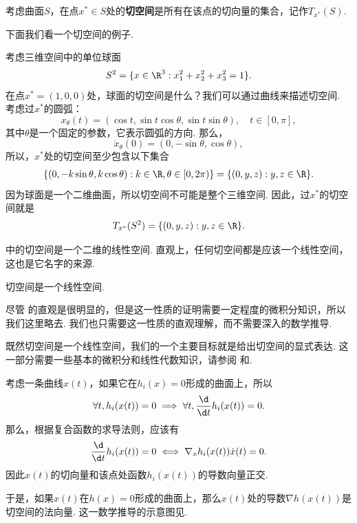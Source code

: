 \begin{definition}[切空间]
    考虑曲面$S$，在点$x^*\in S$处的\textbf{切空间}是所有在该点的切向量的集合，记作$T_{x^*}(S)$.
\end{definition}

下面我们看一个切空间的例子.

\begin{example}[三维球面的切空间]\label{ex:tan-space}
    考虑三维空间中的单位球面
    \[S^2=\{x\in\R^3:x_1^2+x_2^2+x_3^2=1\}.\]
    在点$x^*=(1,0,0)$处，球面的切空间是什么？我们可以通过曲线来描述切空间. 考虑过$x^*$的圆弧：
    \[x_\theta(t)=(\cos t,\sin t\cos\theta,\sin t\sin\theta), \quad t\in[0,\pi],\]
    其中$\theta$是一个固定的参数，它表示圆弧的方向. 那么，
    \[\dot{x}_\theta(0)=(0,-\sin\theta,\cos\theta),\]
    所以，$x^*$处的切空间至少包含以下集合
    \begin{align*}
        \{(0,-k\sin \theta,k\cos\theta):k\in\R,\theta\in[0,2\pi)\}= \{(0,y,z):y,z\in\R\}.
    \end{align*}
    因为球面是一个二维曲面，所以切空间不可能是整个三维空间. 因此，过$x^*$的切空间就是
    \[T_{x^*}(S^2)=\{(0,y,z):y,z\in\R\}.\]
\end{example}

 中的切空间是一个二维的线性空间. 直观上，任何切空间都是应该一个线性空间，这也是它名字的来源. 
\begin{lemma}\label{lemma:tan-space}
    切空间是一个线性空间. 
\end{lemma}

尽管 的直观是很明显的，但是这一性质的证明需要一定程度的微积分知识，所以我们这里略去. 我们也只需要这一性质的直观理解，而不需要深入的数学推导.

既然切空间是一个线性空间，我们的一个主要目标就是给出切空间的显式表达. 这一部分需要一些基本的微积分和线性代数知识，请参阅 和.

考虑一条曲线$x(t)$，如果它在$h_i(x)=0$形成的曲面上，所以
\[\forall t,h_i(x(t))=0\implies\forall t, \frac{\d}{\d t}h_i(x(t))=0.\]
那么，根据复合函数的求导法则，应该有
\[\frac{\d}{\d t}h_i(x(t))=0\iff \nabla_x h_i(x(t))\dot{x}(t)=0.\]
因此$x(t)$的切向量和该点处函数$h_i(x(t))$的导数向量正交. 

于是，如果$x(t)$在$h(x)=0$形成的曲面上，那么$x(t)$处的导数$\nabla h(x(t))$是切空间的法向量. 这一数学推导的示意图见.

